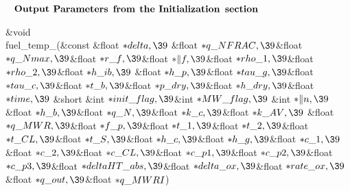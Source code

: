\documentclass[letterpaper,12pt,baseclass=report]{cweb-hy}
\begin{document}
{~\newpage
$\bf{Output}$ $\bf{Parameters}$ $\bf{from}$ $\bf{the}$ $\bf{Initialization}$ $%
\bf{section}$
\\
{ \small
\Y\B\&{void} \\{fuel\_temp\_}(\&{const} \&{float} ${}{*}\\{delta},\39{}$%
\&{float} ${}{*}\\{q\_NFRAC},\39{}$\&{float} ${}{*}\\{q\_Nmax},\39{}$\&{float}
${}{*}\\{r\_f},\39{}$\&{float} ${}{*}\|f,\39{}$\&{float} ${}{*}\\{rho\_1},%
\39{}$\&{float} ${}{*}\\{rho\_2},\39{}$\&{float} ${}{*}\\{h\_ib},\39{}$%
\&{float} ${}{*}\\{h\_p},\39{}$\&{float} ${}{*}\\{tau\_g},\39{}$\&{float}
${}{*}\\{tau\_c},\39{}$\&{float} ${}{*}\\{t\_b},\39{}$\&{float} ${}{*}\\{p%
\_dry},\39{}$\&{float} ${}{*}\\{h\_dry},\39{}$\&{float} ${}{*}\\{time},\39{}$%
\&{short} \&{int} ${}{*}\\{init\_flag},\39{}$\&{int} ${}{*}\\{MW\_flag},\39{}$%
\&{int} ${}{*}\|n,\39{}$\&{float} ${}{*}\\{h\_b},\39{}$\&{float} ${}{*}\\{q%
\_N},\39{}$\&{float} ${}{*}\\{k\_c},\39{}$\&{float} ${}{*}\\{k\_AV},\39{}$%
\&{float} ${}{*}\\{q\_MWR},\39{}$\&{float} ${}{*}\\{f\_p},\39{}$\&{float}
${}{*}\\{t\_1},\39{}$\&{float} ${}{*}\\{t\_2},\39{}$\&{float} ${}{*}\\{t\_CL},%
\39{}$\&{float} ${}{*}\\{t\_S},\39{}$\&{float} ${}{*}\\{h\_c},\39{}$\&{float}
${}{*}\\{h\_g},\39{}$\&{float} ${}{*}\\{c\_1},\39{}$\&{float} ${}{*}\\{c\_2},%
\39{}$\&{float} ${}{*}\\{c\_CL},\39{}$\&{float} ${}{*}\\{c\_p1},\39{}$\&{float}
${}{*}\\{c\_p2},\39{}$\&{float} ${}{*}\\{c\_p3},\39{}$\&{float} ${}{*}%
\\{deltaHT\_abs},\39{}$\&{float} ${}{*}\\{delta\_ox},\39{}$\&{float} ${}{*}%
\\{rate\_ox},\39{}$\&{float} ${}{*}\\{q\_out},\39{}$\&{float} ${}{*}\\{q%
\_MWRI}{}$)\par
\fi

}}
\end{document}
